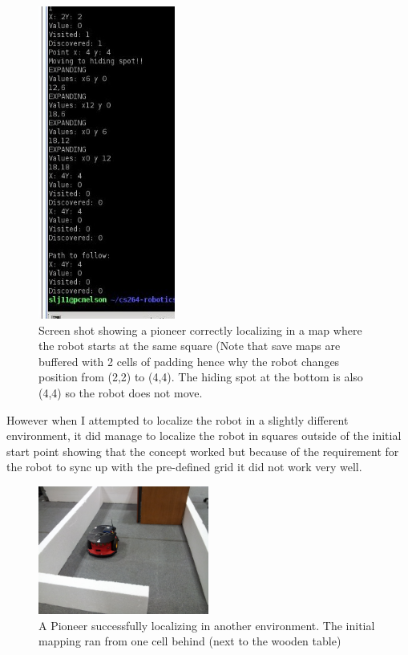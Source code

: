 \documentclass{article}
\begin{document}
\begin{figure}[H]
\centering
\includegraphics[width=0.4\textwidth]{img/robot_pics/localize1.jpg}
\caption{Screen shot showing a pioneer correctly localizing in a map where the robot starts at the same square (Note that save maps are buffered with 2 cells of padding hence why the robot changes position from (2,2) to (4,4). The hiding spot at the bottom is also (4,4) so the robot does not move.}
\label{fig:robot-map-localize1}
\end{figure}

However when I attempted to localize the robot in a slightly different environment, it did manage to localize the robot in squares outside of the initial start point showing that the concept worked but because of the requirement for the robot to sync up with the pre-defined grid it did not work very well.

\begin{figure}[H]
\centering
\includegraphics[width=0.5\textwidth]{img/robot_pics/20130416_142622.jpg}
\caption{A Pioneer successfully localizing in another environment. The initial mapping ran from one cell behind (next to the wooden table)}
\label{fig:robot-map-localize2}
\end{figure}
\end{document}

